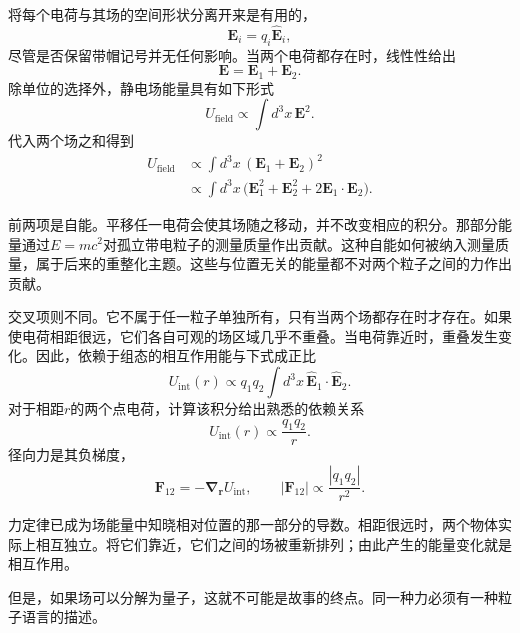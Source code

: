 将每个电荷与其场的空间形状分离开来是有用的，
\begin{equation}
\mathbf E_i=q_i\widehat{\mathbf E}_i,
\end{equation}
尽管是否保留带帽记号并无任何影响。当两个电荷都存在时，线性性给出
\begin{equation}
\mathbf{E}=\mathbf{E}_1+\mathbf{E}_2.
\end{equation}
除单位的选择外，静电场能量具有如下形式
\begin{equation}
U_{\text{field}}\propto\int d^3x\,\mathbf{E}^2.
\end{equation}
代入两个场之和得到
\begin{align}
U_{\text{field}}
&\propto\int d^3x\,(\mathbf{E}_1+\mathbf{E}_2)^2 \\
&\propto\int d^3x\,\bigl(\mathbf{E}_1^2+\mathbf{E}_2^2
  +2\mathbf{E}_1\!\cdot\!\mathbf{E}_2\bigr).
\end{align}

前两项是自能。平移任一电荷会使其场随之移动，并不改变相应的积分。那部分能量通过\(E=mc^2\)对孤立带电粒子的测量质量作出贡献。这种自能如何被纳入测量质量，属于后来的重整化主题。这些与位置无关的能量都不对两个粒子之间的力作出贡献。

交叉项则不同。它不属于任一粒子单独所有，只有当两个场都存在时才存在。如果使电荷相距很远，它们各自可观的场区域几乎不重叠。当电荷靠近时，重叠发生变化。因此，依赖于组态的相互作用能与下式成正比
\begin{equation}
U_{\text{int}}(r)\propto q_1q_2\int d^3x\,
\widehat{\mathbf E}_1\!\cdot\!\widehat{\mathbf E}_2.
\end{equation}
对于相距\(r\)的两个点电荷，计算该积分给出熟悉的依赖关系
\begin{equation}
U_{\text{int}}(r)\propto\frac{q_1q_2}{r}.
\end{equation}
径向力是其负梯度，
\begin{equation}
\mathbf F_{12}=-\boldsymbol\nabla_{\mathbf r}U_{\text{int}},
\qquad
|\mathbf F_{12}|\propto\frac{|q_1q_2|}{r^2}.
\end{equation}

力定律已成为场能量中知晓相对位置的那一部分的导数。相距很远时，两个物体实际上相互独立。将它们靠近，它们之间的场被重新排列；由此产生的能量变化就是相互作用。

但是，如果场可以分解为量子，这就不可能是故事的终点。同一种力必须有一种粒子语言的描述。

